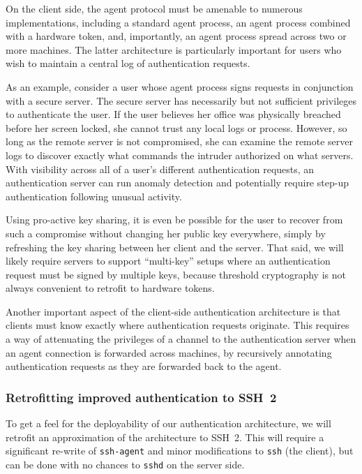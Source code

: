 \documentclass[11pt]{article}
\begin{document}
On the client side, the agent protocol must be amenable to numerous
implementations, including a standard agent process, an agent process
combined with a hardware token, and, importantly, an agent process
spread across two or more machines.  The latter architecture is
particularly important for users who wish to maintain a central log of
authentication requests.

As an example, consider a user whose agent process signs requests in
conjunction with a secure server.  The secure server has necessarily
but not sufficient privileges to authenticate the user.  If the user
believes her office was physically breached before her screen locked,
she cannot trust any local logs or process.  However, so long as the
remote server is not compromised, she can examine the remote server
logs to discover exactly what commands the intruder authorized on what
servers.  With visibility across all of a user's different
authentication requests, an authentication server can run anomaly
detection and potentially require step-up authentication following
unusual activity.

Using pro-active key sharing, it is even be possible for the user to
recover from such a compromise without changing her public key
everywhere, simply by refreshing the key sharing between her client
and the server.  That said, we will likely require servers to support
``multi-key'' setups where an authentication request must be signed by
multiple keys, because threshold cryptography is not always convenient
to retrofit to hardware tokens.

Another important aspect of the client-side authentication
architecture is that clients must know exactly where authentication
requests originate.  This requires a way of attenuating the privileges
of a channel to the authentication server when an agent connection is
forwarded across machines, by recursively annotating authentication
requests as they are forwarded back to the agent.

\subsubsection{Retrofitting improved authentication to SSH~2}

To get a feel for the deployability of our authentication
architecture, we will retrofit an approximation of the architecture to
SSH~2.  This will require a significant re-write of \texttt{ssh-agent}
and minor modifications to \texttt{ssh} (the client), but can be done
with no chances to \texttt{sshd} on the server side.
\end{document}
